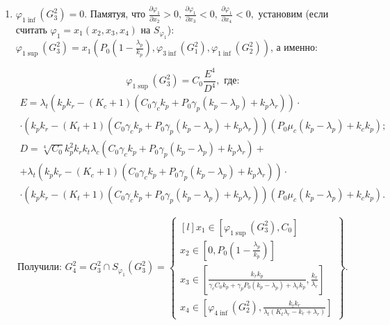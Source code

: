 \documentclass[12pt,a4paper]{article}
\newcommand{\xin}[3]{x_{#1} \in \left[ #2, #3 \right]}
\newcommand{\set}[1]{
    \left\{ \begin{matrix*}[l] #1 \end{matrix*}     
    \right\}   
    }
\begin{document}
\begin{enumerate}
\begin{enumerate}
        \item $\varphi_{1 \inf}(G_3^2) = 0$. Памятуя, что $\frac{\partial \varphi_1}{\partial x_2} > 0,\,  \frac{\partial \varphi_1}{\partial x_3} < 0,\,  \frac{\partial \varphi_1}{\partial x_4} < 0,$ установим  (если считать $ \varphi_1 = x_1(x_2, x_3, x_4)$ на $S_{\varphi_1}$): $ \varphi_{1 \sup}(G_3^2) =  x_1 \left( P_0 \left( 1 - \frac{\lambda_p}{k_p} \right), \varphi_{3 \inf}(G_1^2), \varphi_{1 \inf}(G_2^2) \right)$, а именно: 
        
        $$ \varphi_{1 \sup}(G_3^2) =  C_0 \dfrac{E^4}{D^4}, \text{ где:}$$
        \begin{multline*}
            E = \lambda_{t} \left(k_{p} k_{r} - \left(K_{c} + 1\right) \left(C_{0} \gamma_{c} k_{p} + P_{0} \gamma_{p} \left(k_{p} - \lambda_{p}\right) + k_{p} \lambda_{r}\right)\right) \cdot
            \\
            \cdot \left(k_{p} k_{r} - \left(K_{t} + 1\right) \left(C_{0} \gamma_{c} k_{p} + P_{0} \gamma_{p} \left(k_{p} - \lambda_{p}\right) + k_{p} \lambda_{r}\right)\right) \left(P_{0} \mu_{c} \left(k_{p} - \lambda_{p}\right) + k_{c} k_{p}\right);
        \end{multline*}
        \begin{multline*}
            D = \sqrt[4]{C_{0}} k_{p}^{2} k_{r} k_{t} \lambda_{c} \left(C_{0} \gamma_{c} k_{p} + P_{0} \gamma_{p} \left(k_{p} - \lambda_{p}\right) + k_{p} \lambda_{r}\right) + 
            \\
            +\lambda_{t} \left(k_{p} k_{r} - \left(K_{c} + 1\right) \left(C_{0} \gamma_{c} k_{p} + P_{0} \gamma_{p} \left(k_{p} - \lambda_{p}\right) + k_{p} \lambda_{r}\right)\right) \cdot
            \\
            \cdot \left(k_{p} k_{r} - \left(K_{t} + 1\right) \left(C_{0} \gamma_{c} k_{p} + P_{0} \gamma_{p} \left(k_{p} - \lambda_{p}\right) + k_{p} \lambda_{r}\right)\right) \left(P_{0} \mu_{c} \left(k_{p} - \lambda_{p}\right) + k_{c} k_{p}\right).
        \end{multline*}

        $$\text{Получили: } G_4^2 = G_3^2 \cap S_{\varphi_1}(G_3^2) = 
        \set{
            \xin{1}{\varphi_{1 \sup}(G_3^2)}{ C_0 } \\
            \xin{2}{0}{P_0\left( 1 - \frac{\lambda_p}{k_p} \right)} \\
            \xin{3}{\frac{k_r k_p}{\gamma_c C_0 k_p + \gamma_p P_0 (k_p - \lambda_p) + \lambda_r k_p}}{\frac{k_r}{\lambda_r}} \\
            \xin{4}{\varphi_{4 \inf}(G_2^2)}{\frac{k_t k_r}{\lambda_t(K_t \lambda_r - k_r + \lambda_r)}}
            }.
        $$

    \end{enumerate}


\end{enumerate}
\end{document}
